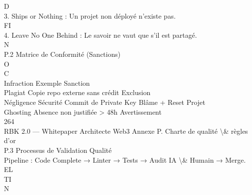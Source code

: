 \documentclass[12pt,landscape,a4paper]{article}
\begin{document}
\vspace{0.5em}
\vspace{0.5em}
\vspace{0.5em}
\vspace{0.5em}
D\\
3. Ships or Nothing : Un projet non déployé n’existe pas.\\
\vspace{0.5em}
\vspace{0.5em}
\vspace{0.5em}
FI\\
4. Leave No One Behind : Le savoir ne vaut que s’il est partagé.\\
N\\
P.2 Matrice de Conformité (Sanctions)\\
O\\
C\\
\vspace{0.5em}
\vspace{0.5em}
Infraction          Exemple                        Sanction\\
Plagiat             Copie repo externe sans crédit Exclusion\\
Négligence Sécurité Commit de Private Key          Blâme + Reset Projet\\
Ghosting            Absence non justifiée \textgreater{} 48h Avertissement\\
\vspace{0.5em}
\vspace{0.5em}
\vspace{0.5em}
\vspace{0.5em}
264\\
RBK 2.0 — Whitepaper Architecte Web3                                               Annexe P. Charte de qualité \textbackslash{}& règles d’or\\
\vspace{0.5em}
\vspace{0.5em}
\vspace{0.5em}
P.3 Processus de Validation Qualité\\
Pipeline : Code Complete → Linter → Tests → Audit IA \textbackslash{}& Humain → Merge.\\
\vspace{0.5em}
\vspace{0.5em}
\vspace{0.5em}
\vspace{0.5em}
EL\\
TI\\
N\\
\end{document}
